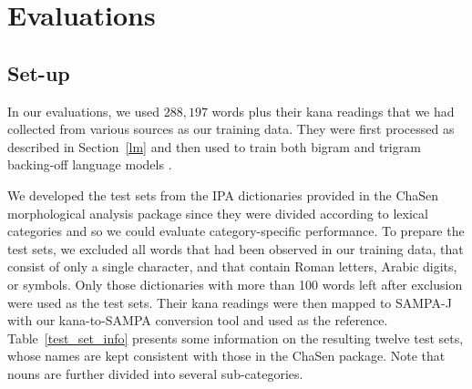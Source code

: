 \section{Evaluations}
\label{evaluation}

\subsection{Set-up}
In our evaluations, we used $288,197$ words plus their kana
readings that we had collected from various sources as our
training data. They were first processed as described in
Section~\ref{lm} and then used to train both bigram and trigram
backing-off language models \cite{KN95}.

We developed the test sets from the IPA dictionaries provided in
the ChaSen morphological analysis package \cite{Chasen} since they
were divided according to lexical categories and so we could
evaluate category-specific performance. To prepare the test sets,
we excluded all words that had been observed in our training data,
that consist of only a single character, and that contain Roman
letters, Arabic digits, or symbols. Only those dictionaries with
more than 100 words left after exclusion were used as the test
sets. Their kana readings were then mapped to SAMPA-J with our
kana-to-SAMPA conversion tool and used as the reference.
Table~\ref{test_set_info} presents some information on the
resulting twelve test sets, whose names are kept consistent with
those in the ChaSen package. Note that nouns are further divided
into several sub-categories.
\renewcommand{\baselinestretch}{}
